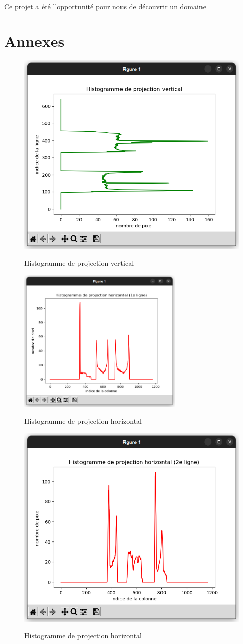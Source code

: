 \documentclass[a4paper]{article}
\begin{document}
		\paragraph{}
		Ce projet a été l'opportunité pour nous de découvrir un domaine 
		



	\newpage
	\section*{Annexes}
		\begin{figure}[H]
			\caption{Histogramme de projection vertical}
			\includegraphics[width=.7\textwidth]{histoY.png}
			\centering
			\label{fig:histoY}
		\end{figure}
		\begin{figure}[H]
			\caption{Histogramme de projection horizontal}
			\includegraphics[width=0.7\textwidth]{histoX1.png}
			\centering
			\label{fig:histoX1}
		\end{figure}
		\begin{figure}[H]
			\caption{Histogramme de projection horizontal}
			\includegraphics[width=.7\textwidth]{histoX2.png}
			\centering
			\label{fig:histoX2}
		\end{figure}
\end{document}
